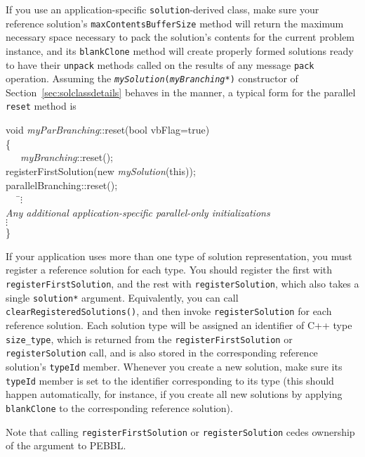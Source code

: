 If you use an application-specific \texttt{solution}-derived class,
make sure your reference solution's \texttt{maxContentsBufferSize}
method will return the maximum necessary space necessary to pack the
solution's contents for the current problem instance, 
and its \texttt{blankClone} method will create
properly formed solutions ready to have their \texttt{unpack} methods
called on the results of any message \texttt{pack} operation.  Assuming the
\texttt{\emph{mySolution}(\emph{myBranching}*)} constructor
of Section~\ref{sec:solclassdetails} behaves in the manner, a typical
form for the parallel \texttt{reset} method is
\begin{codeblock}
void \emph{myParBranching}::reset(bool vbFlag=true) \\
\{ \\
~~~\= \emph{myBranching}::reset();\\
   \> registerFirstSolution(new \emph{mySolution}(this));\\
   \> parallelBranching::reset(); \\
   \> ~~~\=$\vdots$ \\
   \> \textrm{\emph{Any additional application-specific parallel-only
                    initializations}} \\
   \>\> $\vdots$ \\
\}
\end{codeblock}

If your application uses more than one type of solution
representation, you must register a reference solution for each type.
You should register the first with
\texttt{registerFirstSolution}, and the rest with
\texttt{registerSolution}, which also takes a single
\texttt{solution*} argument.  Equivalently, you can call
\texttt{clearRegisteredSolutions()}, and then invoke
\texttt{registerSolution} for each reference solution.  Each solution
type will be assigned an identifier of C++ type \texttt{size\_type},
which is returned from the \texttt{registerFirstSolution} or
\texttt{registerSolution} call, and is also stored in the corresponding
reference solution's \texttt{typeId} member.  Whenever you create a
new solution, make sure its \texttt{typeId} member is set to the
identifier corresponding to its type (this should happen
automatically, for instance, if you create all new solutions by
applying \texttt{blankClone} to the corresponding reference solution).


Note that calling \texttt{registerFirstSolution} or
\texttt{registerSolution} cedes ownership of the argument to PEBBL.

